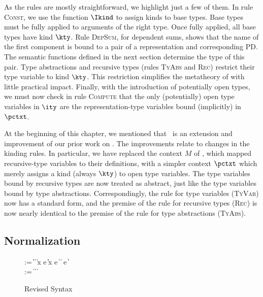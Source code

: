 As the rules are mostly straightforward, we highlight just a few of
them. In rule \textsc{Const}, we use the function $\Ikind$ to assign
kinds to base types.  Base types must be fully applied to arguments of
the right type.  Once fully applied, all base types have kind $\kty$.
Rule \textsc{DepSum}, for dependent sums, shows that the name of the first component is
bound to a pair of a representation and corresponding PD.  The
semantic functions defined in the next section determine the type of
this pair. Type abstractions and recursive types (rules \textsc{TyAbs}
and \textsc{Rec}) restrict their type
variable to kind $\kty$. This restriction simplifies the metatheory
of \ddc{} with little practical impact.
Finally, with the introduction of potentially open \implang types, we
must now check in rule \textsc{Compute} that the only (potentially)
open type variables in $\ity$ are the representation-type variables
bound (implicitly) in $\pctxt$.

At the beginning of this chapter, we mentioned that \ddc\ is an
extension and improvement of our prior work on \ddcold. The
improvements relate to changes in the kinding rules. In particular, we
have replaced the context $M$ of \ddcold{}, which mapped
recursive-type variables to their definitions, with a simpler context
$\pctxt$ which merely assigns a kind (always $\kty$) to open type
variables.  The type variables bound by recursive types are now
treated as abstract, just like the type variables bound by type
abstractions.  Correspondingly, the rule for type variables
(\textsc{TyVar}) now has a standard form, and the premise of the rule
for recursive types (\textsc{Rec}) is now nearly identical to the
premise of the rule for type abstractions (\textsc{TyAbs}).

\subsection{\ddc{} Normalization}
\label{sec:ddc-norm}

\begin{figure}
\begin{bnf}
   \meta{\tyval} \::= 
    \ptrue\| \pfalse \|  \| \plam{\var}{\ity}{\ty} \|
    \psig x \ty \ty  \nlalt
    \psum \ty e \ty  \| \pand \ty \ty \|
    \pset x \ty e \|
    \pseq \ty {} \nlalt
    \pmu{\ptyvar}{}{\ty}  \| \plam{\ptyvar}{}{\ty} \nlalt
    \pcompute e \ity \| \pabsorb \ty \| \pscan{\ty} 
    \\
   \meta{\ty} \::= \tyval \|  \|
                               \papp{\ty}{\ty} \| \ptyvar
\end{bnf}
  \caption{Revised \ddc{} Syntax}
  \label{fig:revised-ddc-syntax}
\end{figure}

